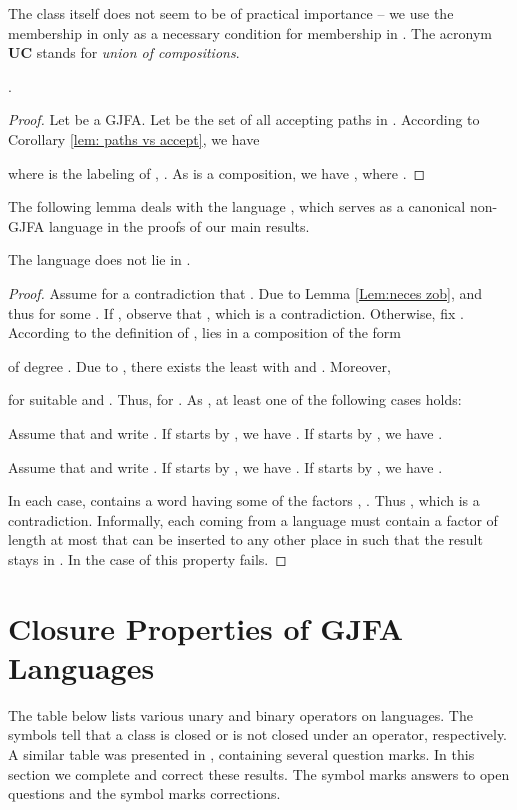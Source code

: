 \documentclass{ws-ijmpc}
\begin{document}
The class\textbf{  }itself does not seem to be of practical
importance -- we use the membership in  only as a necessary
condition for membership in . The acronym \textbf{UC}
stands for \emph{union of compositions}\@.
\begin{lemma}
\label{Lem:neces zob}.\end{lemma}
\begin{proof}
Let  be a GJFA. Let 
be the set of all accepting paths in . According to Corollary
\ref{lem: paths vs accept}, we have 

where  is the
labeling of , . As 
is a composition, we have ,
where .
\end{proof}
The following lemma deals with the language ,
which serves as a canonical non-GJFA language in the proofs of our
main results.
\begin{lemma}
\label{lem:gjfa ab star}The language 
does not lie in .\end{lemma}
\begin{proof}
Assume for a contradiction that . Due to Lemma
\ref{Lem:neces zob},  and thus 
for some . If , observe that ,
which is a contradiction. Otherwise, fix .
According to the definition of  ,  lies in a
composition  of the form

of degree . Due to , there exists the least 
with  and . Moreover,

for suitable  and . Thus,  for .
As , at least one of the following cases holds:
\begin{romanlist}
\item Assume that  and write .
If  starts by , we have .
If  starts by , we have .
\item Assume that  and write .
If  starts by , we have .
If  starts by , we have .
\end{romanlist}

In each case,  contains a word having some of the factors ,
. Thus , which is a contradiction. Informally,
each  coming from a language  must contain
a factor  of length at most  that can be inserted to any other
place in  such that the result stays in . In the
case of  this property fails.

\end{proof}

\section{Closure Properties of GJFA Languages}

The table below lists various unary and binary operators on languages.
The symbols  tell that a class is closed or is not closed under
an operator, respectively. A similar table was presented in \citep{athMED1,athMED1book},
containing several question marks. In this section we complete and
correct these results. The symbol  marks answers to
open questions and the symbol  marks corrections.
\end{document}
